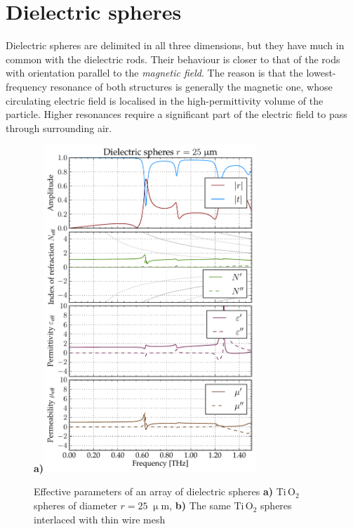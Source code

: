 \documentclass[letterpaper,12pt]{report}
\begin{document}
\section{Dielectric spheres}
Dielectric spheres are delimited in all three dimensions, but they have much in common with the dielectric rods. Their behaviour is closer to that of the rods with orientation parallel to the \textit{magnetic field}. The reason is that the lowest-frequency resonance of both structures is generally the magnetic one, whose circulating electric field is localised in the high-permittivity volume of the particle. Higher resonances require a significant part of the electric field to pass through surrounding air.

\begin{figure}[ht]  \caption{Effective parameters of an array of dielectric spheres \textbf{a)} Ti$\,$O$_{2}$ spheres of diameter $r=25\;\upmu$m, \textbf{b)} The same Ti$\,$O$_{2}$ spheres interlaced with thin wire mesh }
\label{fg_spheres_fdtd} \centering 
\textbf{a)}\includegraphics[width=8cm]{img/Sphere_eps100_R25_FDTD.pdf}

\end{figure}
\end{document}
